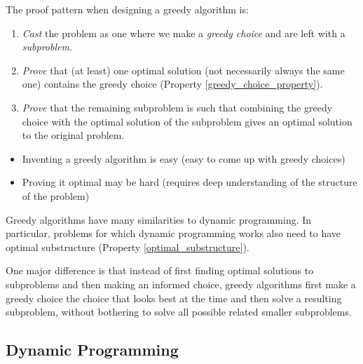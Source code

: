 The proof pattern when designing a greedy algorithm is:
\begin{enumerate}[partopsep=0em, topsep=0em, label=(\roman*)]
  \item \emph{Cast} the problem as one where we make a \emph{greedy choice} and are left with a \emph{subproblem}. \label{greedy_design_step:cast}
  \item \emph{Prove} that (at least) one optimal solution (not necessarily always the same one) contains the greedy choice (Property \ref{greedy_choice_property}).
  \item \emph{Prove} that the remaining subproblem is such that combining the greedy choice with the optimal solution of the subproblem gives an optimal solution to the original problem.%
\end{enumerate}

\begin{remark}\label{rem:designing_greedy_algorithms}
\leavevmode
\begin{itemize}
  \item Inventing a greedy algorithm is easy (easy to come up with greedy choices)
  \item Proving it optimal may be hard (requires deep understanding of the structure of the problem)
  \qedhere
\end{itemize}
\end{remark}


\begin{remark}\label{rem:greedy_vs_dp}
Greedy algorithms have many similarities to dynamic programming. 
In particular, problems for which dynamic programming works also need to have optimal substructure (Property \ref{optimal_substructure}).

One major difference is that instead of first finding optimal solutions to subproblems and then making an informed choice, greedy algorithms first make a greedy choice the choice that looks best at the time and then solve a resulting subproblem, without bothering to solve all possible related smaller subproblems.
\end{remark}


\subsection{Dynamic Programming}\label{sec:dynamic_programming}


